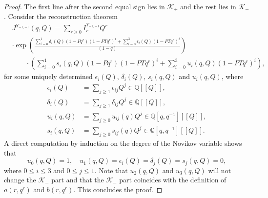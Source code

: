 \documentclass[11pt]{amsart}
\newtheorem*{main theorem*}{Main Theorem}
\theoremstyle{remark}
\numberwithin{equation}{section}
\newcommand{\e}{\epsilon}
\begin{document}
\begin{proof}
The first line after the second equal sign lies in $\mathcal{K}_+$ and the rest lies in $\mathcal{K}_-$. Consider the reconstruction theorem \cite[Theorem~2]{Givental_PEVIII_ER}
\[
\begin{split}
    &J^{Y_{-1,-1}}(q, Q) =  \sum_{r\geq 0}  I_r^{Y_{-1,-1}} Q^r  
    \\ 
    & \cdot\exp \left( \frac{ \sum_{i=0}^1\delta_i(Q)(1-Pq^{r})(1-PT q^r)^i + \sum_{i=0}^3 \e_i(Q) (1-PT q^{r})^i}{(1-q)} \right) 
    \\
    &\qquad \cdot\left( \sum_{i=0}^1 s_i(q,Q)(1-Pq^r)(1-PT q^r)^i + \sum_{i=0}^3 u_i(q,Q) (1-PTq^r)^i \right),
\end{split}
\]
for some uniquely determined $\e_i(Q)$, $\delta_i(Q)$, $s_i(q,Q)$ and $u_i (q, Q)$, where
\[
\begin{split}
    \e_i(Q)& = \sum_{j \geq 1} \e_{ij}Q^j \in \mathbb{Q}[\![Q]\!], \\
    \delta_i(Q) &=\sum_{j \geq 1} \delta_{ij}Q^j \in \mathbb{Q}[\![Q]\!],
    \\
    u_i(q,Q) 
   & = \sum_{j\geq 0} u_{ij}(q) Q^j \in \mathbb{Q}[q,q^{-1}][\![Q]\!],
   \\
   s_i(q,Q) 
   & = \sum_{j\geq 0} s_{ij}(q) Q^j \in \mathbb{Q}[q,q^{-1}][\![Q]\!].
\end{split}
\]
A direct computation by induction on the degree of the Novikov variable shows that 
\[
u_0(q,Q) = 1, \quad u_1(q,Q)=\e_i(Q)=\delta_j(Q)=s_j(q,Q)=0,
\]
where $0\leq i \leq 3$ and $0\leq j \leq 1$. Note that $u_2(q,Q)$ and $u_3(q,Q)$ will not change the $\mathcal{K}_-$ part and that the $\mathcal{K}_-$ part coincides with the definition of $a(r,q^r)$ and $b(r,q^r)$.  This concludes the proof.
\end{proof}
\end{document}

